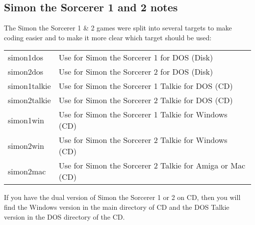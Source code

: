 \subsection{Simon the Sorcerer 1 and 2 notes}
The Simon the Sorcerer 1 \& 2 games were split into several targets to make
coding easier and to make it more clear which target should be used:

\begin{tabular}{ll}
       simon1dos    & Use for Simon the Sorcerer 1 for DOS (Disk)\\
       simon2dos    & Use for Simon the Sorcerer 2 for DOS (Disk)\\
       simon1talkie & Use for Simon the Sorcerer 1 Talkie for DOS (CD)\\
       simon2talkie & Use for Simon the Sorcerer 2 Talkie for DOS (CD)\\
       simon1win    & Use for Simon the Sorcerer 1 Talkie for Windows (CD)\\
       simon2win    & Use for Simon the Sorcerer 2 Talkie for Windows (CD)\\
       simon2mac    & Use for Simon the Sorcerer 2 Talkie for Amiga or Mac (CD)\\
\end{tabular}

If you have the dual version of Simon the Sorcerer 1 or 2 on CD,
then you will find the Windows version in the main directory of CD
and the DOS Talkie version in the DOS directory of the CD.
